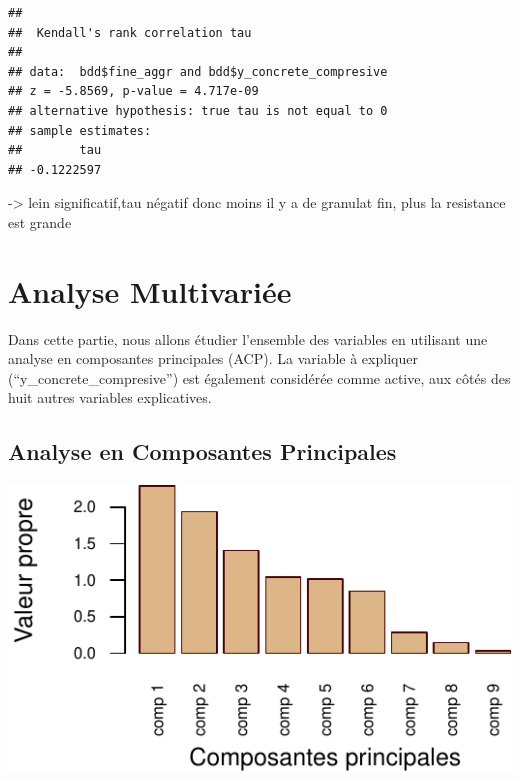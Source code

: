 \documentclass[
  12pt,
]{article}
\newenvironment{Shaded}{\begin{snugshade}}{\end{snugshade}}
\newcommand{\AttributeTok}[1]{\textcolor[rgb]{0.13,0.29,0.53}{#1}}
\newcommand{\FunctionTok}[1]{\textcolor[rgb]{0.13,0.29,0.53}{\textbf{#1}}}
\newcommand{\NormalTok}[1]{#1}
\newcommand{\SpecialCharTok}[1]{\textcolor[rgb]{0.81,0.36,0.00}{\textbf{#1}}}
\newcommand{\StringTok}[1]{\textcolor[rgb]{0.31,0.60,0.02}{#1}}
\begin{document}
\begin{Shaded}
\end{Shaded}

\begin{verbatim}
## 
##  Kendall's rank correlation tau
## 
## data:  bdd$fine_aggr and bdd$y_concrete_compresive
## z = -5.8569, p-value = 4.717e-09
## alternative hypothesis: true tau is not equal to 0
## sample estimates:
##        tau 
## -0.1222597
\end{verbatim}

-\textgreater{} lein significatif,tau négatif donc moins il y a de
granulat fin, plus la resistance est grande

\section{Analyse Multivariée}\label{analyse-multivariuxe9e}

Dans cette partie, nous allons étudier l'ensemble des variables en
utilisant une analyse en composantes principales (ACP). La variable à
expliquer (``y\_concrete\_compresive'') est également considérée comme
active, aux côtés des huit autres variables explicatives.

\subsection{Analyse en Composantes
Principales}\label{analyse-en-composantes-principales}

\begin{center}\includegraphics{rmd_final_files/figure-latex/unnamed-chunk-17-1} \end{center}
\end{document}
